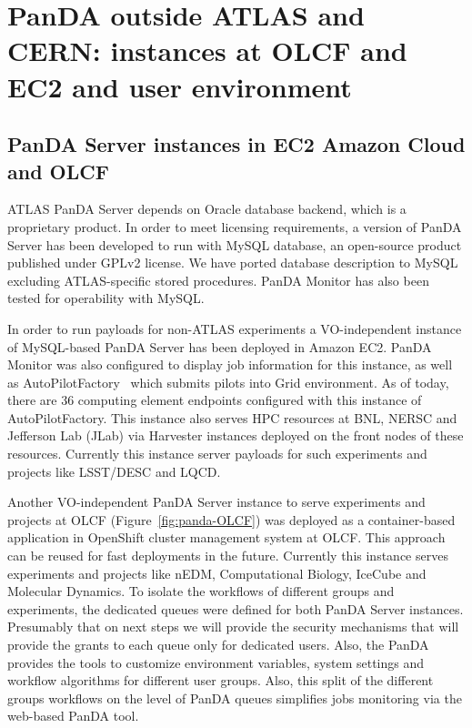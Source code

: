 \documentclass{webofc}
\begin{document}
\section{PanDA outside ATLAS and CERN: instances at OLCF and EC2 and user environment}
\subsection{PanDA Server instances in EC2 Amazon Cloud and OLCF}


ATLAS PanDA Server depends on Oracle database backend, which is a proprietary product. In order to meet licensing requirements, a version of PanDA Server has been developed to run with MySQL database, an open-source product published under GPLv2 license.  We have ported database description to MySQL excluding ATLAS-specific stored procedures. PanDA Monitor has also been tested for operability with MySQL.

In order to run payloads for non-ATLAS experiments a VO-independent instance of MySQL-based PanDA Server has been deployed in Amazon EC2.  PanDA Monitor was also configured to display job information for this instance, as well as AutoPilotFactory~\cite{PanDAPilotSubmission} which submits pilots into Grid environment. As of today, there are 36 computing element endpoints configured with this instance of AutoPilotFactory. This instance also serves HPC resources at BNL, NERSC and Jefferson Lab (JLab) via Harvester instances deployed on the front nodes of these resources. Currently this instance server payloads for such experiments and projects like LSST/DESC and LQCD.

Another VO-independent PanDA Server instance to serve experiments and projects at OLCF (Figure~\ref{fig:panda-OLCF}) was deployed as a container-based application in OpenShift cluster management system at OLCF. This approach can be reused for fast deployments in the future. Currently this instance serves experiments and projects like nEDM, Computational Biology, IceCube and Molecular Dynamics.
To isolate the workflows of different groups and experiments, the dedicated queues were defined for both PanDA Server instances. Presumably that on next steps we will provide the security mechanisms that will provide the grants to each queue only for dedicated users. Also, the PanDA provides the tools to customize environment variables, system settings and workflow algorithms for different user groups. Also, this split of the different groups workflows on the level of PanDA queues simplifies jobs monitoring via the web-based PanDA tool. 
\end{document}
